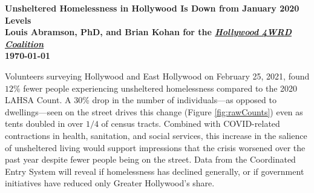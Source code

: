 \documentclass[11pt]{article}
\def\bfr{\bf\color{red}}
\begin{document}

\begin{center}
	\Large\bf Unsheltered Homelessness in Hollywood Is Down from January 2020 Levels\\
	\vspace{1ex}
	{\normalsize\rm Louis Abramson, PhD, and Brian Kohan 
	for the \href{http://www.hollywood4wrd.live}{\it Hollywood 4WRD Coalition} \\ \today 
	}%
\end{center}

 Volunteers surveying Hollywood and East Hollywood on February 25, 
2021, found $12\%$ fewer people experiencing unsheltered homelessness compared to the 2020 
LAHSA Count. A 30\% drop in the number of individuals---as opposed to dwellings---seen on the street
drives this change (Figure \ref{fig:rawCounts}) even as tents doubled in over $1/4$ of 
census tracts. Combined with COVID-related contractions in health, sanitation, and social 
services, this increase in the salience of unsheltered living would support impressions that the crisis
worsened over the past year despite fewer people being on the street. Data from the Coordinated Entry 
System will reveal if homelessness has declined generally, or if government initiatives have reduced 
only Greater Hollywood's share.

\end{document}
